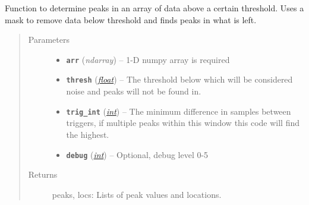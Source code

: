 \documentclass[a4paper,10pt,english]{sphinxmanual}
\begin{document}
\begin{fulllineitems}
\label{submodules/utils.findpeaks:findpeaks.find_peaks2_short}
Function to determine peaks in an array of data above a certain threshold.
Uses a mask to remove data below threshold and finds peaks in what is left.
\begin{quote}\begin{description}
\item[{Parameters}] \leavevmode\begin{itemize}
\item {} 
\textbf{\texttt{arr}} (\emph{ndarray}) -- 1-D numpy array is required

\item {} 
\textbf{\texttt{thresh}} (\href{https://docs.python.org/library/functions.html\#float}{\emph{float}}) -- The threshold below which will be considered noise and peaks    will not be found in.

\item {} 
\textbf{\texttt{trig\_int}} (\href{https://docs.python.org/library/functions.html\#int}{\emph{int}}) -- The minimum difference in samples between triggers,    if multiple peaks within this window this code will find the highest.

\item {} 
\textbf{\texttt{debug}} (\href{https://docs.python.org/library/functions.html\#int}{\emph{int}}) -- Optional, debug level 0-5

\end{itemize}

\item[{Returns}] \leavevmode
peaks, locs: Lists of peak values and locations.

\end{description}\end{quote}

\end{fulllineitems}

\end{document}
